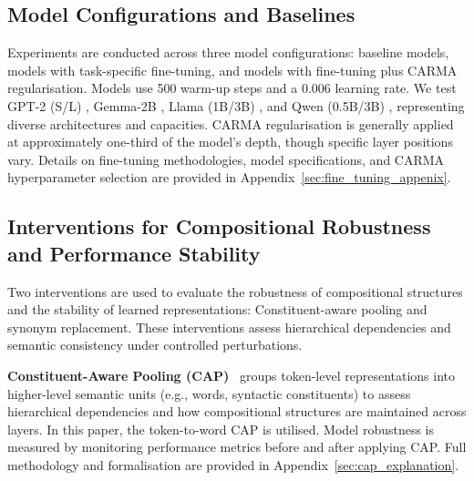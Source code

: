 \subsection{Model Configurations and Baselines}
Experiments are conducted across three model configurations: baseline models, models with task-specific fine-tuning, and models with fine-tuning plus CARMA regularisation. Models use 500 warm-up steps and a 0.006 learning rate. We test GPT-2 (S/L) \cite{radford2019language}, Gemma-2B \cite{team2024gemma}, Llama (1B/3B) \cite{dubey2024llama}, and Qwen (0.5B/3B) \cite{yang2024qwen2}, representing diverse architectures and capacities. CARMA regularisation is generally applied at approximately one-third of the model’s depth, though specific layer positions vary. Details on fine-tuning methodologies, model specifications, and CARMA hyperparameter selection are provided in Appendix~\ref{sec:fine_tuning_appenix}.

\subsection{Interventions for Compositional Robustness and Performance Stability}
Two interventions are used to evaluate the robustness of compositional structures and the stability of learned representations: Constituent-aware pooling and synonym replacement. These interventions assess hierarchical dependencies and semantic consistency under controlled perturbations.

\noindent\textbf{Constituent-Aware Pooling (CAP)}~\cite{aljaafari2024interpreting} groups token-level representations into higher-level semantic units (e.g., words, syntactic constituents) to assess hierarchical dependencies and how compositional structures are maintained across layers. In this paper, the token-to-word CAP is utilised. Model robustness is measured by monitoring performance metrics before and after applying CAP. Full methodology and formalisation are provided in Appendix~\ref{sec:cap_explanation}.

